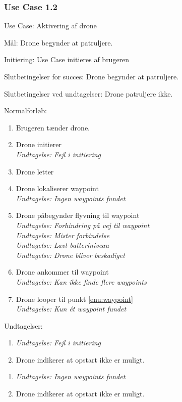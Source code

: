 \documentclass[Main]{subfiles}
\begin{document}
\subsubsection{Use Case 1.2}


Use Case: Aktivering af drone

Mål: Drone begynder at patruljere.

Initiering: Use Case initieres af brugeren

Slutbetingelser for succes: 
Drone begynder at patruljere.

Slutbetingelser ved undtagelser: 
Drone patruljere ikke.

Normalforløb: 
	
	\begin{enumerate}
	\item Brugeren tænder drone.
	\item Drone initierer\\
		\textit{Undtagelse: Fejl i initiering}
	\item Drone letter
	\item \label{enu:waypoint} Drone lokaliserer waypoint \\
		\textit{Undtagelse: Ingen waypoints fundet}
	\item \label{enu:flyvning} Drone påbegynder flyvning til waypoint\\
		\textit{Undtagelse: Forhindring på vej til waypoint}\\
		\textit{Undtagelse: Mister forbindelse}\\
		\textit{Undtagelse: Lavt batteriniveau}\\
		\textit{Undtagelse: Drone bliver beskadiget}
	\item Drone ankommer til waypoint\\
		\textit{Undtagelse: Kan ikke finde flere waypoints}
	\item Drone looper til punkt \ref{enu:waypoint}\\
		\textit{Undtagelse: Kun ét waypoint fundet}
	\end{enumerate}



Undtagelser:

	\begin{enumerate}
	\item[] \textit{Undtagelse: Fejl i initiering}
	\item Drone indikerer at opstart ikke er muligt.
	\end{enumerate}


	\begin{enumerate}
	\item[] \textit{Undtagelse: Ingen waypoints fundet}
	\item Drone indikerer at opstart ikke er muligt.
	\end{enumerate}
	
\end{document}
